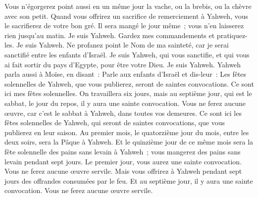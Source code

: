 \begin{multicols}{2}
Vous n'égorgerez point aussi en un même jour la vache, ou la brebis, ou la chèvre avec son petit.
Quand vous offrirez un sacrifice de remerciement à Yahweh, vous le sacrifierez de votre bon gré.
Il sera mangé le jour même~; vous n'en laisserez rien jusqu'au matin. Je suis Yahweh.
Gardez mes commandements et pratiquez-les. Je suis Yahweh.
Ne profanez point le Nom de ma sainteté, car je serai sanctifié entre les enfants d'Israël. Je suis Yahweh, qui vous sanctifie,
et qui vous ai fait sortir du pays d'Egypte, pour être votre Dieu. Je suis Yahweh.
\VerseOne{}Yahweh parla aussi à Moïse, en disant~:
Parle aux enfants d'Israël et dis-leur~: Les fêtes solennelles de Yahweh, que vous publierez, seront de saintes convocations. Ce sont ici mes fêtes solennelles.
On travaillera six jours, mais au septième jour, qui est le sabbat, le jour du repos, il y aura une sainte convocation. Vous ne ferez aucune œuvre, car c'est le sabbat à Yahweh, dans toutes vos demeures.
Ce sont ici les fêtes solennelles de Yahweh, qui seront de saintes convocations, que vous publierez en leur saison.
Au premier mois, le quatorzième jour du mois, entre les deux soirs, sera la Pâque à Yahweh.
Et le quinzième jour de ce même mois sera la fête solennelle des pains sans levain à Yahweh~; vous mangerez des pains sans levain pendant sept jours.
Le premier jour, vous aurez une sainte convocation. Vous ne ferez aucune œuvre servile.
Mais vous offrirez à Yahweh pendant sept jours des offrandes consumées par le feu. Et au septième jour, il y aura une sainte convocation. Vous ne ferez aucune œuvre servile.

\end{multicols}
